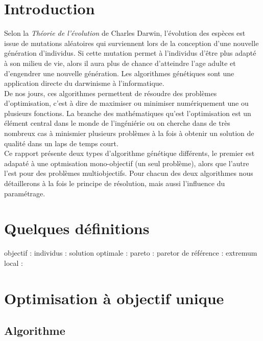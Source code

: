 \documentclass[12pt]{report}
\begin{document}
  \chapter{Introduction}
    Selon la \emph{Théorie de l'évolution} \cite{darwin} de Charles Darwin, l'évolution des espèces est issue de mutations aléatoires qui surviennent lors de la conception d'une nouvelle génération d'individus. Si cette mutation permet à l'individus d'être plus adapté à son milieu de vie, alors il aura plus de chance d'atteindre l'age adulte et d'engendrer une nouvelle génération.
    Les algorithmes génétiques sont une application directe du darwinisme à l'informatique.\\
    De nos jours, ces algorithmes permettent de résoudre des problèmes d'optimisation, c'est à dire de maximiser ou minimiser numériquement une ou plusieurs fonctions.
    La branche des mathématiques qu'est l'optimisation est un élément central dans le monde de l'ingéniérie ou on cherche dans de très nombreux cas à minismier plusieurs problèmes à la fois à obtenir un solution de qualité dans un laps de temps court.\\
    Ce rapport présente deux types d'algorithme génétique différents, le premier est adapaté à une optmisation mono-objectif (un seul problème), alors que l'autre l'est pour des problèmes multiobjectifs. Pour chacun des deux algorithmes nous détaillerons à la fois le principe de résolution, mais aussi l'influence du paramétrage.

  \tableofcontents
  \chapter{Quelques définitions}
    objectif :
    individus :
    solution optimale :
    pareto :
    paretor de référence :
    extremum local :



  \chapter{Optimisation à objectif unique}
    \section{Algorithme}
\end{document}

